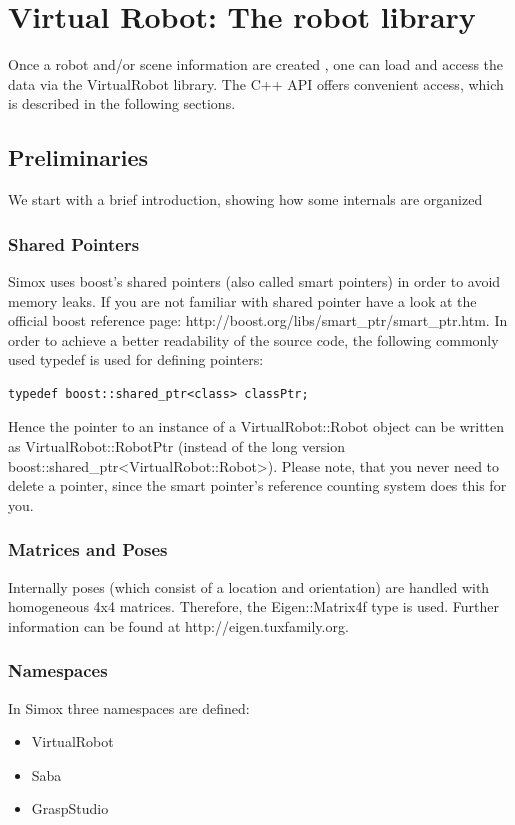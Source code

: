 \section{Virtual Robot: The robot library}
Once a robot and/or scene information are created , one can load and access the data via the VirtualRobot library. The C++ API offers convenient access, which is described in the following sections. 
\par
\subsection{Preliminaries}
We start with a brief introduction, showing how some internals are organized 
\par
\subsubsection{Shared Pointers}
Simox uses boost's shared pointers (also called smart pointers) in order to avoid memory leaks. If you are not familiar with shared pointer have a look at the official boost reference page: http://boost.org/libs/smart\_ptr/smart\_ptr.htm. In order to achieve a better readability of the source code, the following commonly used typedef is used for defining pointers: 
\begin{lstlisting}
typedef boost::shared_ptr<class> classPtr;
\end{lstlisting}
Hence the pointer to an instance of a VirtualRobot::Robot object can be written as VirtualRobot::RobotPtr (instead of the long version boost::shared\_ptr<VirtualRobot::Robot>). Please note, that you never need to delete a pointer, since the smart pointer's reference counting system does this for you. 
\subsubsection{Matrices and Poses}
Internally poses (which consist of a location and orientation) are handled with homogeneous 4x4 matrices. Therefore, the Eigen::Matrix4f type is used. Further information can be found at http://eigen.tuxfamily.org. 
\par
\subsubsection{Namespaces}
In Simox three namespaces are defined: 
\begin{itemize}
\item VirtualRobot
\item Saba
\item GraspStudio
\end{itemize}
